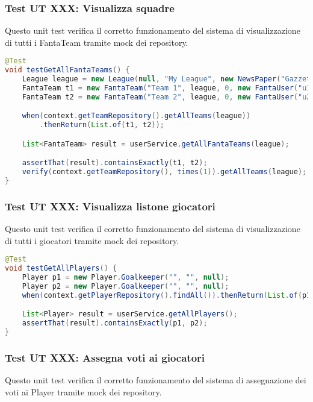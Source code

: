 \subsubsection{Test UT XXX: Visualizza squadre} \label{UT14}

Questo unit test verifica il corretto funzionamento del sistema di visualizzazione di tutti i FantaTeam 
tramite mock dei repository.

\begin{lstlisting}[language=Java]
@Test
void testGetAllFantaTeams() {
    League league = new League(null, "My League", new NewsPaper("Gazzetta"), "L999");
	FantaTeam t1 = new FantaTeam("Team 1", league, 0, new FantaUser("u1", "pwd"), Set.of());
	FantaTeam t2 = new FantaTeam("Team 2", league, 0, new FantaUser("u2", "pwd"), Set.of());

	when(context.getTeamRepository().getAllTeams(league))
        .thenReturn(List.of(t1, t2));

	List<FantaTeam> result = userService.getAllFantaTeams(league);

	assertThat(result).containsExactly(t1, t2);
	verify(context.getTeamRepository(), times(1)).getAllTeams(league);
}
\end{lstlisting}


\subsubsection{Test UT XXX: Visualizza listone giocatori} \label{UT15}

Questo unit test verifica il corretto funzionamento del sistema di visualizzazione di tutti i giocatori 
tramite mock dei repository.

\begin{lstlisting}[language=Java]
@Test
void testGetAllPlayers() {
	Player p1 = new Player.Goalkeeper("", "", null);
	Player p2 = new Player.Goalkeeper("", "", null);
	when(context.getPlayerRepository().findAll()).thenReturn(List.of(p1, p2));

	List<Player> result = userService.getAllPlayers();
	assertThat(result).containsExactly(p1, p2);
}
\end{lstlisting}


\subsubsection{Test UT XXX: Assegna voti ai giocatori} \label{UT16}

Questo unit test verifica il corretto funzionamento del sistema di assegnazione dei voti ai Player tramite mock dei repository.


